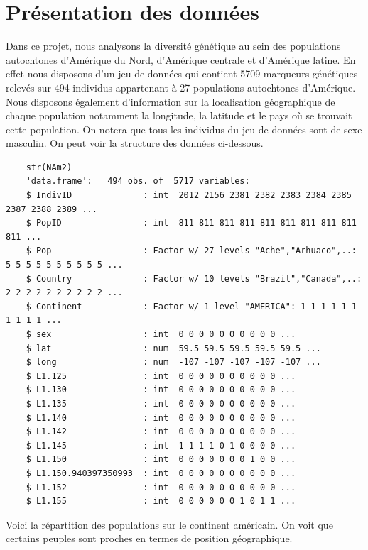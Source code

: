 \documentclass[12pt,a4paper]{article}
\begin{document}
\section{Présentation des données}
Dans ce projet, nous analysons la diversité génétique au sein des
populations autochtones d'Amérique du Nord, d'Amérique centrale et d'Amérique
latine. En effet nous disposons d'un jeu de données qui contient 5709 marqueurs
génétiques relevés sur 494 individus appartenant à 27 populations autochtones
d'Amérique. Nous disposons également d'information sur la localisation
géographique de chaque population notamment la longitude, la latitude et le
pays où se trouvait cette population. On notera que tous les individus du jeu
de données sont de sexe masculin. On peut voir la structure des données
ci-dessous.\vspace{2mm} 
\begin{lstlisting}
	str(NAm2)
	'data.frame':	494 obs. of  5717 variables:
	$ IndivID              : int  2012 2156 2381 2382 2383 2384 2385 2387 2388 2389 ...
	$ PopID                : int  811 811 811 811 811 811 811 811 811 811 ...
	$ Pop                  : Factor w/ 27 levels "Ache","Arhuaco",..: 5 5 5 5 5 5 5 5 5 5 ...
	$ Country              : Factor w/ 10 levels "Brazil","Canada",..: 2 2 2 2 2 2 2 2 2 2 ...
	$ Continent            : Factor w/ 1 level "AMERICA": 1 1 1 1 1 1 1 1 1 1 ...
	$ sex                  : int  0 0 0 0 0 0 0 0 0 0 ...
	$ lat                  : num  59.5 59.5 59.5 59.5 59.5 ...
	$ long                 : num  -107 -107 -107 -107 -107 ...
	$ L1.125               : int  0 0 0 0 0 0 0 0 0 0 ...
	$ L1.130               : int  0 0 0 0 0 0 0 0 0 0 ...
	$ L1.135               : int  0 0 0 0 0 0 0 0 0 0 ...
	$ L1.140               : int  0 0 0 0 0 0 0 0 0 0 ...
	$ L1.142               : int  0 0 0 0 0 0 0 0 0 0 ...
	$ L1.145               : int  1 1 1 1 0 1 0 0 0 0 ...
	$ L1.150               : int  0 0 0 0 0 0 0 1 0 0 ...
	$ L1.150.940397350993  : int  0 0 0 0 0 0 0 0 0 0 ...
	$ L1.152               : int  0 0 0 0 0 0 0 0 0 0 ...
	$ L1.155               : int  0 0 0 0 0 0 1 0 1 1 ...
\end{lstlisting}
Voici la répartition des populations sur le continent américain. On voit que 
certains peuples sont proches en termes de position géographique.
\end{document}
